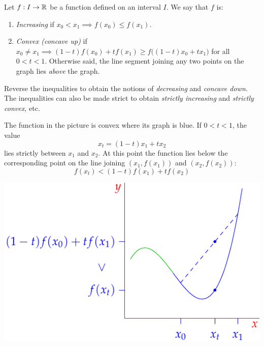 \begin{defn}{}{}
Let $f:I\to\mathbb{R}$ be a function defined on an interval $I$. We say that $f$ is:
\begin{enumerate}
  \item \emph{Increasing} if $x_0<x_1\implies f(x_0)\le f(x_1)$.
	\item \emph{Convex (concave up)} if $x_0\neq x_1\implies (1-t)f(x_0)+tf(x_1)\ge f\bigl((1-t)x_0+tx_1\bigr)$ for all $0<t<1$. Otherwise said, the line segment joining any two points on the graph lies \emph{above} the graph.
\end{enumerate}
Reverse the inequalities to obtain the notions of \emph{decreasing} and \emph{concave down.} The inequalities can also be made strict to obtain \emph{strictly increasing} and \emph{strictly convex,} etc.
\end{defn}

\begin{minipage}[t]{0.45\linewidth}\vspace{0pt}
The function in the picture is convex where its graph is blue. If $0<t<1$, the  value
\[x_t=(1-t)x_1+tx_2\]
lies strictly between $x_1$ and $x_2$. At this point the function lies below the corresponding point on the line joining $(x_1,f(x_1))$ and $(x_2,f(x_2))$:
\[f(x_t)<(1-t)f(x_1)+tf(x_2)\]
\end{minipage}\begin{minipage}[t]{0.55\linewidth}\vspace{0pt}
\flushright\includegraphics{poly-convex}
\end{minipage}\par

